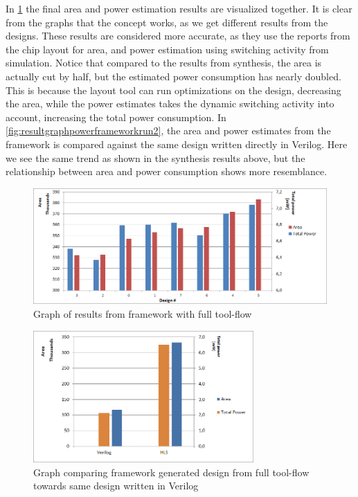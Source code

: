 In \cref{fig:resultgraphframeworkrun3} the final area and power estimation results are visualized together. It is clear from the graphs that the concept works, as we get different results from the designs. These results are considered more accurate, as they use the reports from the chip layout for area, and power estimation using switching activity from simulation. Notice that compared to the results from synthesis, the area is actually cut by half, but the estimated power consumption has nearly doubled. This is because the layout tool can run optimizations on the design, decreasing the area, while the power estimates takes the dynamic switching activity into account, increasing the total power consumption. In \cref{fig:resultgraphpowerframeworkrun2}, the area and power estimates from the framework is compared against the same design written directly in Verilog. Here we see the same trend as shown in the synthesis results above, but the relationship between area and power consumption shows more resemblance.

\begin{figure}[hbpt]
\centering
\includegraphics[width=\textwidth]{../figs/resultGraph3.png}
\caption{\label{fig:resultgraphframeworkrun3}Graph of results from framework with full tool-flow}
\end{figure}

\begin{figure}[hbpt]
\centering
\includegraphics[width=0.75\textwidth]{../figs/resultComparison3.png}
\caption{\label{fig:resultcomparisonhlsrun3}Graph comparing framework generated design from full tool-flow towards same design written in Verilog}
\end{figure}

